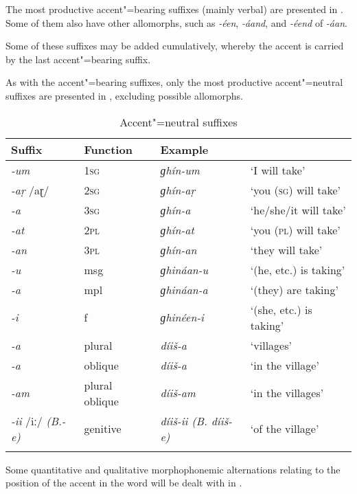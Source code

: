 The most productive accent"=bearing suffixes (mainly verbal) are presented in . Some of them also have other allomorphs, such as \textit{-éen}, \textit{-áand}, and \textit{-éend} of \textit{-áan}.


Some of these suffixes may be added cumulatively, whereby the accent is carried by the last accent"=bearing suffix.


As with the accent"=bearing suffixes, only the most productive accent"=neutral suffixes are presented in , excluding possible allomorphs.



\begin{table}[ht]
\caption{Accent"=neutral suffixes}
\begin{tabularx}{\textwidth}{ l@{\hspace{20pt}} l@{\hspace{20pt}} l@{\hspace{20pt}} Q }
\lsptoprule
Suffix &
Function &
Example &
\\\hline
\textit{-um} &
\textsc{1sg} &
\textit{ɡhín-um} &
`I will take'\\
\textit{-aṛ} /aɽ/ &
\textsc{2sg} &
\textit{ɡhín-aṛ} &
`you (\textsc{sg}) will take'\\
\textit{-a} &
\textsc{3sg} &
\textit{ɡhín-a} &
`he/she/it will take'\\
\textit{-at} &
\textsc{2pl} &
\textit{ɡhín-at} &
`you (\textsc{pl}) will take'\\
\textit{-an} &
\textsc{3pl} &
\textit{ɡhín-an} &
`they will take'\\
\textit{-u} &
msg &
\textit{ɡhináan-u} &
`(he, etc.) is taking'\\
\textit{-a} &
mpl &
\textit{ɡhináan-a} &
`(they) are taking'\\
\textit{-i} &
f &
\textit{ɡhinéen-i} &
`(she, etc.) is taking'\\
\textit{-a} &
plural &
\textit{díiš-a} &
`villages'\\
\textit{-a} &
oblique &
\textit{díiš-a} &
`in the village'\\
\textit{-am} &
plural oblique &
\textit{díiš-am} &
`in the villages'\\
\textit{-ii} /iː/ \textit{(B.-e)} &
genitive &
\textit{díiš-ii (B. díiš-e)} &
`of the village'\\\lspbottomrule
\end{tabularx}
\label{tab:3-6}
\end{table}


Some quantitative and qualitative morphophonemic alternations relating to the position of the accent in the word will be dealt with in .


